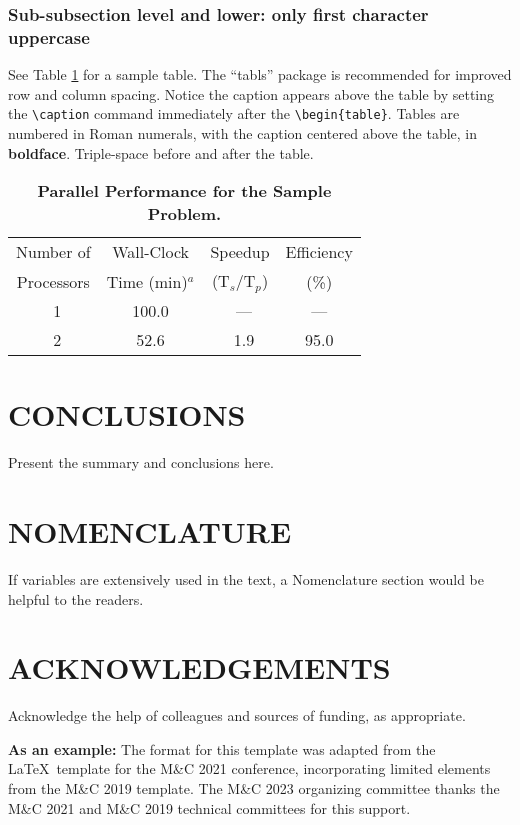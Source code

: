 \documentclass[letterpaper]{mc2023}
\begin{document}
\subsubsection{Sub-subsection level and lower: only first character uppercase}

See Table \ref{table:example} for a sample table.  The ``tabls'' package is
recommended for improved row and column spacing.  Notice the caption appears
above the table by setting the \verb!\caption! command immediately
after the \verb!\begin{table}!. Tables are numbered in Roman
numerals, with the caption centered above the table, in \textbf{boldface}.
Triple-space before and after the table.

\begin{table}[!htb]
  \centering
  \caption{\bf Parallel Performance for the Sample Problem.}
  \label{table:example}
  \begin{tabular}{|c|c|c|c|} \hline
   Number of & Wall-Clock & Speedup & Efficiency \\
   Processors & Time (min)$^a$& (T$_{s}$/T$_{p}$) & (\%) \\ \hline
    \ 1 &  100.0 & \ ---    & ---  \\ \hline
    \ 2 &   52.6 & \ 1.9    & 95.0 \\ \hline
  \end{tabular}
\end{table}

\section{CONCLUSIONS}

Present the summary and conclusions here.

\section*{NOMENCLATURE}

If variables are extensively used in the text, a Nomenclature section would be helpful to the readers.

\section*{ACKNOWLEDGEMENTS}

Acknowledge the help of colleagues and sources of funding, as appropriate.

\textbf{As an example:} The format for this template was adapted from the \LaTeX\ template for the M\&C 2021
conference, incorporating limited elements from the M\&C 2019 template.  The M\&C 2023 organizing committee
thanks the M\&C 2021 and M\&C 2019 technical committees for this support.
\end{document}
